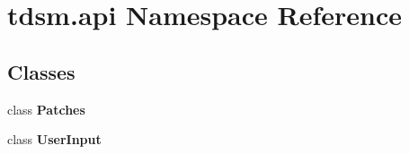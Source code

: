 \hypertarget{namespacetdsm_1_1api}{}\section{tdsm.\+api Namespace Reference}
\label{namespacetdsm_1_1api}
\subsection*{Classes}
\begin{DoxyCompactItemize}
\item 
class {\bfseries Patches}
\item 
class {\bfseries User\+Input}
\end{DoxyCompactItemize}
